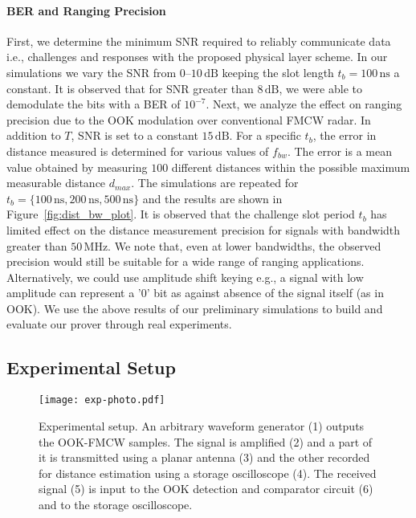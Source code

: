 \documentclass{sig-alternate-10pt}
\newcommand{\ie}{i.e.,\xspace}
\newcommand{\unit}[1]{\ensuremath{\, \mathrm{#1}}}
\begin{document}
\paragraph{BER and Ranging Precision}
\label{sec:ber-ranging-precision}
First, we determine the minimum SNR required to reliably communicate data \ie
challenges and responses with the proposed physical layer scheme. In our
simulations we vary the SNR from $0$--$10\unit{dB}$ keeping the slot length
$t_b=100\unit{ns}$ a constant. It is observed that for SNR greater than
$8\unit{dB}$, we were able to demodulate the bits with a BER of $10^{-7}$. Next,
we analyze the effect on ranging precision due to the OOK modulation over
conventional FMCW radar. In addition to $T$, SNR is set to a constant
$15\unit{dB}$. For a specific $t_b$, the error in distance measured is
determined for various values of $f_{bw}$. The error is a mean value obtained by
measuring $100$ different distances within the possible maximum measurable
distance $d_{max}$. The simulations are repeated for
$t_b=\{100\unit{ns},200\unit{ns},500\unit{ns}\}$ and the results are shown in
Figure~\ref{fig:dist_bw_plot}. It is observed that the challenge slot period
$t_b$ has limited effect on the distance measurement precision for signals with
bandwidth greater than $50\unit{MHz}$. We note that, even at lower bandwidths,
the observed precision would still be suitable for a wide range of ranging
applications. Alternatively, we could use amplitude shift keying e.g., a signal
with low amplitude can represent a '0' bit as against absence of the signal
itself (as in OOK). We use the above results of our preliminary simulations to
build and evaluate our prover through real experiments.

\subsection{Experimental Setup}
\label{sec:experimental-setup}

\begin{figure}[t]
  \centering
  \texttt{[image: exp-photo.pdf]}
  \caption{Experimental setup. An arbitrary waveform generator (1) outputs the
    OOK-FMCW samples. The signal is amplified (2) and a part of it is transmitted using a
    planar antenna (3) and the other recorded for distance estimation using a
    storage oscilloscope (4). The received signal (5) is input to the OOK
    detection and comparator circuit (6) and to the storage oscilloscope.}
  \label{fig:exp-photo}
\end{figure}
\end{document}
